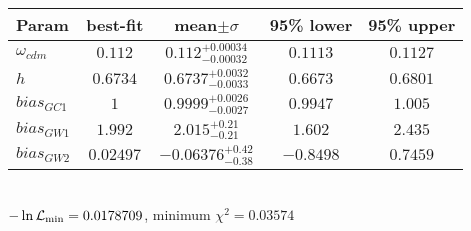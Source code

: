 \begin{tabular}{|l|c|c|c|c|} 
 \hline 
Param & best-fit & mean$\pm\sigma$ & 95\% lower & 95\% upper \\ \hline 
$\omega_{cdm }$ &$0.112$ & $0.112_{-0.00032}^{+0.00034}$ & $0.1113$ & $0.1127$ \\ 
$h$ &$0.6734$ & $0.6737_{-0.0033}^{+0.0032}$ & $0.6673$ & $0.6801$ \\ 
$bias_{GC 1 }$ &$1$ & $0.9999_{-0.0027}^{+0.0026}$ & $0.9947$ & $1.005$ \\ 
$bias_{GW 1 }$ &$1.992$ & $2.015_{-0.21}^{+0.21}$ & $1.602$ & $2.435$ \\ 
$bias_{GW 2 }$ &$0.02497$ & $-0.06376_{-0.38}^{+0.42}$ & $-0.8498$ & $0.7459$ \\ 
\hline 
 \end{tabular} \\ 
$-\ln{\cal L}_\mathrm{min} =0.0178709$, minimum $\chi^2=0.03574$ \\ 
